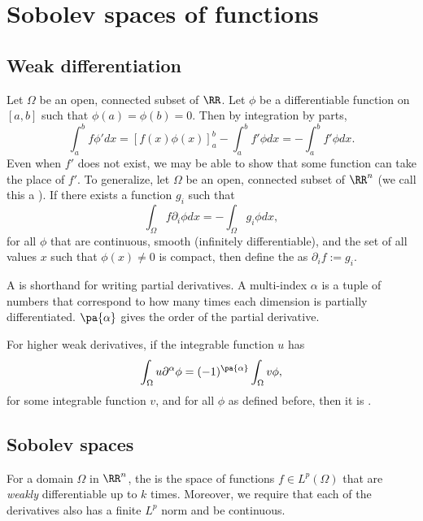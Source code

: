 \documentclass{scrartcl}
\begin{document}
\section{Sobolev spaces of functions}

\subsection{Weak differentiation}

Let $\Omega$ be an open, connected subset of $\RR$. 
Let $\phi$ be a differentiable 
function on $[a,b]$ such that $\phi(a)=\phi(b) = 0$. 
Then by integration by parts, 
\[
    \int_a^b f\phi'dx = \left[f(x)\phi(x)\right]_{a}^{b} - \int_a^b f' \phi dx = - \int_a^b f' \phi dx.
\]
Even when $f'$ does not exist, we may be able to show that some function 
can take the place of $f'$. To generalize, let $\Omega$ be an open, connected
subset of $\RR^n$ (we call this a ). If there exists a function $g_i$ such that 
\[
    \int_\Omega f\partial_i\phi dx = -\int_\Omega g_i\phi dx,
\] 
for all $\phi$ that are continuous, smooth (infinitely differentiable),
and the set of all values $x$ such that $\phi(x)\neq 0$ is compact,
then define the  as $\partial_if := g_i$.

\begin{definition}
    A  is shorthand for writing partial derivatives.
    A multi-index $\alpha$ is a tuple of numbers that correspond to how many 
    times each dimension is partially differentiated.
    $\pa{\alpha}$ gives the order of the partial derivative.
\end{definition}

For higher weak derivatives, if the integrable function $u$ has 
\[
    \int_\Omega u\partial^\alpha\phi  = (-1)^{\pa{\alpha}} \int_\Omega v\phi,
\]
for some integrable function $v$, and for all $\phi$ as defined before,
then it is .

\subsection{Sobolev spaces}

\begin{definition}
    For a domain $\Omega$ in $\RR^n$, 
    the  is the space 
    of functions $f\in L^{p}(\Omega)$ 
    that are \textit{weakly} differentiable up to $k$ times. 
    Moreover, we require that each of the derivatives also has a finite $L^p$ norm and be continuous.
\end{definition}
\end{document}
